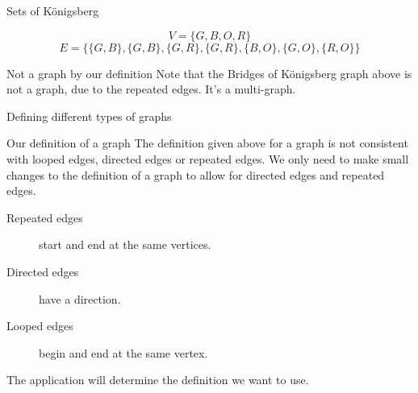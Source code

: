 \documentclass{beamer}
\begin{document}
  
  \begin{frame}{Sets of K{\"o}nigsberg}
    \begin{adjustbox}{width={0.4\textwidth},center} 
    \end{adjustbox}
    \vspace{-2mm}
    $$V = \{G, B, O, R\}$$
    \vspace{-6mm}
    $$E = \{\{G, B\}, \{G, B\}, \{G, R\},\{G, R\}, \{B, O\}, \{G, O\},\{R, O\}\}$$
  
    \begin{alertblock}{Not a graph by our definition}
      Note that the Bridges of K{\"o}nigsberg graph above is not a graph, due to the repeated edges.
      It's a multi-graph.
    \end{alertblock}
  \end{frame}
  
  \begin{frame}{Defining different types of graphs}
    
    \begin{alertblock}{Our definition of a graph}
    The definition given above for a graph is not consistent with looped edges, directed edges or repeated edges. We only need to make small changes to the definition of a graph to allow for directed edges and repeated edges.
    \end{alertblock}
    
    \begin{description}
      \item[Repeated edges] start and end at the same vertices.
      \item[Directed edges] have a direction.
      \item[Looped edges] begin and end at the same vertex.
    \end{description}
    
    The application will determine the definition we want to use.
  \end{frame}
  
\end{document}
